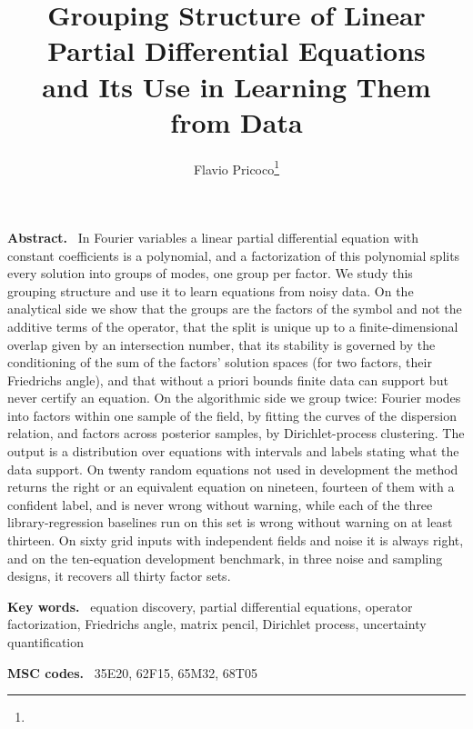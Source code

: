 \documentclass[11pt]{article}
\title{Grouping Structure of Linear Partial Differential Equations\\and Its Use in Learning Them from Data}
\author{Flavio Pricoco\thanks{\email{flaflapr@gmail.com}}}
\newenvironment{keywords}{\par\smallskip\noindent\textbf{Key words.}\ }{\par}
\newenvironment{MSCcodes}{\par\smallskip\noindent\textbf{MSC codes.}\ }{\par}
\renewenvironment{abstract}{\par\small\noindent\textbf{Abstract.}\ }{\par\normalsize}
\theoremstyle{plain}
\theoremstyle{definition}
\theoremstyle{remark}
\begin{document}
\maketitle

\begin{abstract}
In Fourier variables a linear partial differential equation with constant coefficients is a polynomial, and a
factorization of this polynomial splits every solution into groups of modes, one group per factor. We study this
grouping structure and use it to learn equations from noisy data. On the analytical side we show that the groups are
the factors of the symbol and not the additive terms of the operator, that the split is unique up to a
finite-dimensional overlap given by an intersection number, that its stability is governed by the conditioning of the
sum of the factors' solution spaces (for two factors, their Friedrichs angle), and that without a priori bounds finite
data can support but never certify an equation. On the algorithmic side we group twice: Fourier modes into factors
within one sample of the field, by fitting the curves of the dispersion relation, and factors across posterior samples,
by Dirichlet-process clustering. The output is a distribution over equations with intervals and labels stating what
the data support. On twenty random equations not used in development the method returns the right or an equivalent
equation on nineteen, fourteen of them with a confident label, and is never wrong without warning, while each of the
three library-regression baselines run on this set is wrong without warning on at least thirteen. On sixty grid inputs with
independent fields and noise it is always right, and on the ten-equation development benchmark, in three noise and
sampling designs, it recovers all thirty factor sets.
\end{abstract}

\begin{keywords}
equation discovery, partial differential equations, operator factorization, Friedrichs angle, matrix pencil,
Dirichlet process, uncertainty quantification
\end{keywords}

\begin{MSCcodes}
35E20, 62F15, 65M32, 68T05
\end{MSCcodes}


\end{document}
